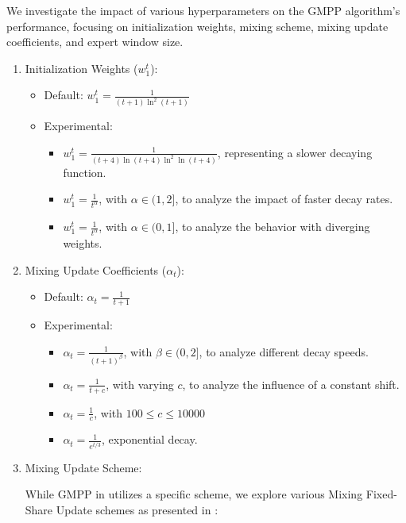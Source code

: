 \documentclass[12pt, twoside]{article}
\begin{document}
We investigate the impact of various hyperparameters on the GMPP algorithm's performance, focusing on initialization weights, mixing scheme, mixing update coefficients, and expert window size. 
\begin{enumerate}
\item Initialization Weights ($w_1^t$):
\begin{itemize}
\item Default: $w_1^t = \frac{1}{(t+1)\ln^2(t+1)}$
\item Experimental: 
\begin{itemize}
\item $w_1^t = \frac{1}{(t+4)\ln(t+4)\ln^2\ln(t+4)}$, representing a slower decaying function.
\item $w_1^t = \frac{1}{t^\alpha}$, with $\alpha \in (1, 2]$, to analyze the impact of faster decay rates.
\item $w_1^t = \frac{1}{t^\alpha}$, with $\alpha \in (0, 1]$, to analyze the behavior with diverging weights.


\end{itemize}
\end{itemize}


\contourlength{0.1pt}

\item Mixing Update Coefficients ($\alpha_t$):
\begin{itemize}
\item Default: $\alpha_t = \frac{1}{t+1}$
\item Experimental: 
\begin{itemize}
\item $\alpha_t = \frac{1}{(t+1)^\beta}$, with $\beta \in (0, 2]$, to analyze different decay speeds.
\item $\alpha_t = \frac{1}{t+c}$, with varying $c$, to analyze the influence of a constant shift.
\item $\alpha_t = \frac{1}{c}$, with $100 \le c \le10000$
\item $\alpha_t = \frac{1}{e^{t/3}}$, exponential decay.         

\end{itemize}


\end{itemize}

\item Mixing Update Scheme:

While GMPP in \cite{vvbook} utilizes a specific scheme, we explore various Mixing Fixed-Share Update schemes as presented in \cite{article02}:


\end{enumerate}
\end{document}

